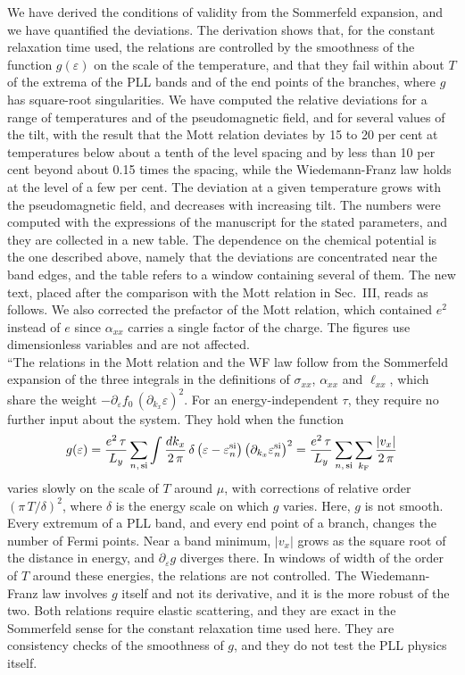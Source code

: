 \documentclass[aps,prb,onecolumn,nofootinbib,citeautoscript,10pt]{revtex4-2}
\begin{document}
\begin{enumerate}
We have derived the conditions of validity from the Sommerfeld expansion, and we have quantified the deviations. The derivation shows that, for the constant relaxation time used, the relations are controlled by the smoothness of the function $g(\varepsilon)$ on the scale of the temperature, and that they fail within about $T$ of the extrema of the PLL bands and of the end points of the branches, where $g$ has square-root singularities. We have computed the relative deviations for a range of temperatures and of the pseudomagnetic field, and for several values of the tilt, with the result that the Mott relation deviates by 15 to 20 per cent at temperatures below about a tenth of the level spacing and by less than 10 per cent beyond about 0.15 times the spacing, while the Wiedemann-Franz law holds at the level of a few per cent. The deviation at a given temperature grows with the pseudomagnetic field, and decreases with increasing tilt. The numbers were computed with the expressions of the manuscript for the stated parameters, and they are collected in a new table. The dependence on the chemical potential is the one described above, namely that the deviations are concentrated near the band edges, and the table refers to a window containing several of them. The new text, placed after the comparison with the Mott relation in Sec.~III, reads as follows. We also corrected the prefactor of the Mott relation, which contained $e^2$ instead of $e$ since $\alpha_{xx}$ carries a single factor of the charge. The figures use dimensionless variables and are not affected.\\``The relations in the Mott relation and the WF law follow from the Sommerfeld expansion of the three integrals in the definitions of $\sigma_{xx}$, $\alpha_{xx}$ and $\ell_{xx}$, which share the weight $-\partial_\varepsilon f_0\,(\partial_{k_x}\varepsilon)^2$. For an energy-independent $\tau$, they require no further input about the system. They hold when the function
\begin{align}
g(\varepsilon)=\frac{e^2\,\tau}{L_y}\sum_{n,\,{\rm si}}\int\frac{dk_x}{2\,\pi}\,\delta\left(\varepsilon-\varepsilon_n^{\rm si}\right)\left(\partial_{k_x}\varepsilon^{\rm si}_n\right)^2=\frac{e^2\,\tau}{L_y}\sum_{n,\,{\rm si}}\sum_{k_{\rm F}}\frac{|v_x|}{2\,\pi}
\end{align}
varies slowly on the scale of $T$ around $\mu$, with corrections of relative order $(\pi\,T/\delta)^2$, where $\delta$ is the energy scale on which $g$ varies. Here, $g$ is not smooth. Every extremum of a PLL band, and every end point of a branch, changes the number of Fermi points. Near a band minimum, $|v_x|$ grows as the square root of the distance in energy, and $\partial_\varepsilon g$ diverges there. In windows of width of the order of $T$ around these energies, the relations are not controlled. The Wiedemann-Franz law involves $g$ itself and not its derivative, and it is the more robust of the two. Both relations require elastic scattering, and they are exact in the Sommerfeld sense for the constant relaxation time used here. They are consistency checks of the smoothness of $g$, and they do not test the PLL physics itself.


\end{enumerate}
\end{document}
